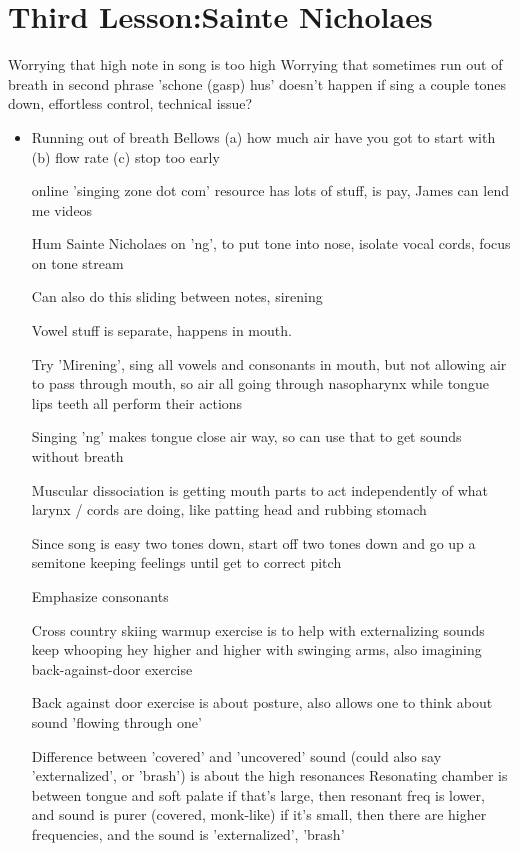 \documentclass[14pt,a4paper]{memoir}
\begin{document}
\section*{Third Lesson:Sainte Nicholaes}

Worrying that high note in song is too high
Worrying that sometimes run out of breath in second phrase 'schone (gasp) hus'
doesn't happen if sing a couple tones down, effortless control, technical issue?



\begin{itemize}
\item Running out of breath
  Bellows
  (a) how much air have you got to start with
  (b) flow rate
  (c) stop too early


  online 'singing zone dot com' resource has lots of stuff, is pay, James can lend me videos

  Hum Sainte Nicholaes on 'ng', to put tone into nose, isolate vocal cords, focus on tone stream

  Can also do this sliding between notes, sirening

  Vowel stuff is separate, happens in mouth.

  Try 'Mirening', sing all vowels and consonants in mouth, but not allowing air to pass through mouth, so air all going through nasopharynx
  while tongue lips teeth all perform their actions

  Singing 'ng' makes tongue close air way, so can use that to get sounds without breath

  Muscular dissociation is getting mouth parts to act independently of what larynx / cords are doing, like patting head and rubbing stomach

  Since song is easy two tones down, start off two tones down and go up a semitone keeping feelings until get to correct pitch

  Emphasize consonants


  Cross country skiing warmup exercise is to help with externalizing sounds
  keep whooping hey higher and higher with swinging arms, also imagining back-against-door exercise

  Back against door exercise is about posture, also allows one to think about sound 'flowing through one'

  Difference between 'covered' and 'uncovered' sound (could also say 'externalized', or 'brash')
  is about the high resonances
  Resonating chamber is between tongue and soft palate
  if that's large, then resonant freq is lower, and sound is purer (covered, monk-like)
  if it's small, then there are higher frequencies, and the sound is 'externalized', 'brash'



\end{itemize}
\end{document}
